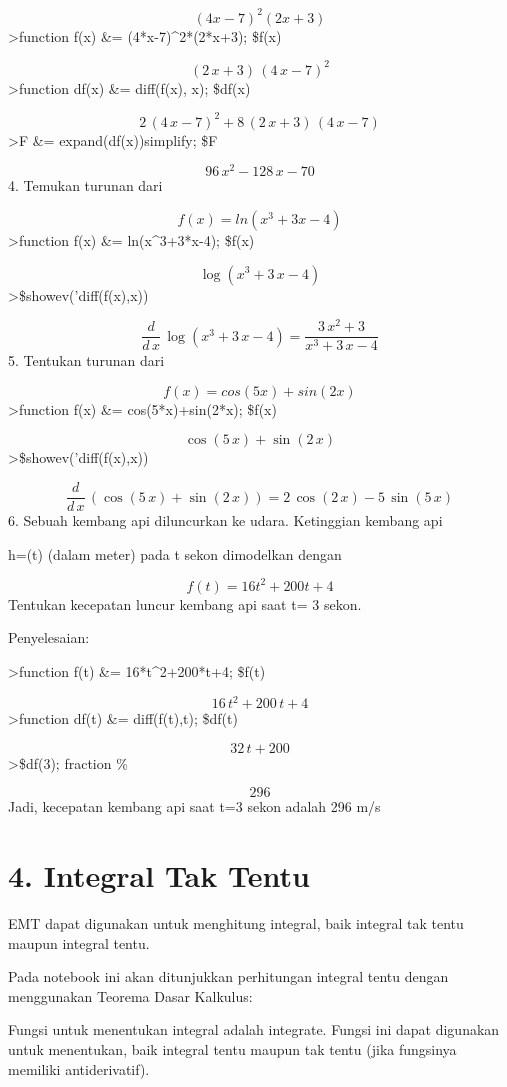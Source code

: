 \documentclass[
]{book}
\begin{document}
\[(4x-7)^2(2x+3)\]\textgreater function f(x) \&= (4*x-7)\^{}2*(2*x+3); \$f(x)

\[\left(2\,x+3\right)\,\left(4\,x-7\right)^2\]\textgreater function df(x) \&= diff(f(x), x); \$df(x)

\[2\,\left(4\,x-7\right)^2+8\,\left(2\,x+3\right)\,\left(4\,x-7  \right)\]\textgreater F \&= expand(df(x))\textbar simplify; \$F

\[96\,x^2-128\,x-70\]4. Temukan turunan dari

\[f(x)=ln(x^3+3x-4)\]\textgreater function f(x) \&= ln(x\^{}3+3*x-4); \$f(x)

\[\log \left(x^3+3\,x-4\right)\]\textgreater\$showev('diff(f(x),x))

\[\frac{d}{d\,x}\,\log \left(x^3+3\,x-4\right)=\frac{3\,x^2+3}{x^3+3  \,x-4}\]5. Tentukan turunan dari

\[f(x)=cos(5x)+sin(2x)\]\textgreater function f(x) \&= cos(5*x)+sin(2*x); \$f(x)

\[\cos \left(5\,x\right)+\sin \left(2\,x\right)\]\textgreater\$showev('diff(f(x),x))

\[\frac{d}{d\,x}\,\left(\cos \left(5\,x\right)+\sin \left(2\,x\right)  \right)=2\,\cos \left(2\,x\right)-5\,\sin \left(5\,x\right)\]6. Sebuah kembang api diluncurkan ke udara. Ketinggian kembang api

h=(t) (dalam meter) pada t sekon dimodelkan dengan

\[f(t)=16t^2+200t+4\] Tentukan kecepatan luncur kembang api saat t= 3 sekon.

Penyelesaian:

\textgreater function f(t) \&= 16*t\^{}2+200*t+4; \$f(t)

\[16\,t^2+200\,t+4\]\textgreater function df(t) \&= diff(f(t),t); \$df(t)

\[32\,t+200\]\textgreater\$df(3); fraction \%

\[296\]Jadi, kecepatan kembang api saat t=3 sekon adalah 296 m/s

\chapter{4. Integral Tak Tentu}\label{integral-tak-tentu}

EMT dapat digunakan untuk menghitung integral, baik integral tak tentu maupun integral tentu.

Pada notebook ini akan ditunjukkan perhitungan integral tentu dengan menggunakan Teorema Dasar Kalkulus:

Fungsi untuk menentukan integral adalah integrate. Fungsi ini dapat digunakan untuk menentukan, baik integral tentu maupun tak tentu (jika fungsinya memiliki antiderivatif).
\end{document}
